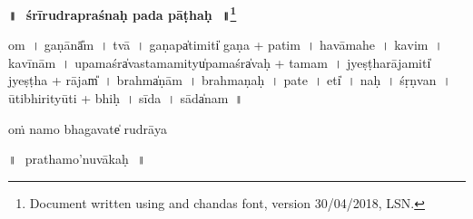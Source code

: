 \documentclass[parskip, DIV=14]{scrartcl}
\renewcommand{\thefootnote}{\fnsymbol{footnote}} %
\begin{document}

\vspace{-1.5cm}

\begin{center}
\textbf{{\Huge॥\,~śrīrudrapraśnaḥ pada pāṭhaḥ\,~॥\LARGE\let\thefootnote\relax\footnote{\color{lightgray} Document written using \XeLaTeX{} and chandas font,  version 30/04/2018, LSN.}}}
\end{center}
\Large


\vspace{1cm}

om~।
ga॒ṇānā̎m~।
tvā॒~।
ga॒ṇapa̍ti॒miti̍ ga॒ṇa + pa॒ti॒m~।
ha॒vā॒ma॒he॒~।
ka॒vim~।
ka॒vī॒nām~।
u॒pa॒maśra̍vastama॒mityu̍pa॒maśra̍vaḥ + ta॒ma॒m~।
jye॒ṣṭha॒rāja॒miti̍ jyeṣṭha + rājam̎~।
brahma̍ṇām~।
bra॒hma॒ṇa॒ḥ~।
pa॒te॒~।
eti̍~।
na॒ḥ~।
śṛ॒ṇvan~।
ū॒tibhi॒rityū॒ti + bhi॒ḥ~।
sī॒da॒~।
sāda̍nam~॥

\vspace{1cm}

\centering
oṁ namo bhagavate̍ rudrā॒ya
\justify

\vspace{1cm}


\LARGE
{\centering ॥\,~prathamo'nuvākaḥ\,~॥\\}
\Large
\vspace{1cm}
\end{document}
